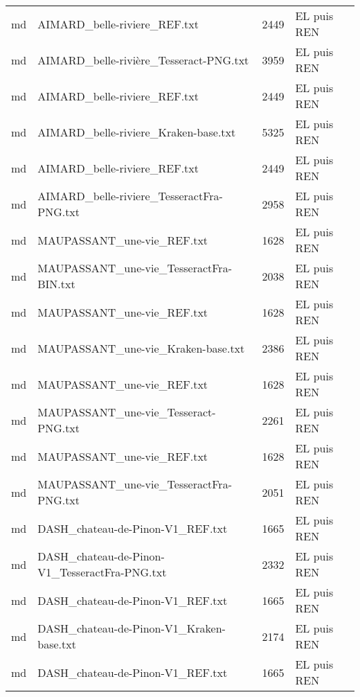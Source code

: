 \begin{tabular}{llrl}
    md &                       AIMARD\_belle-riviere\_REF.txt &                  2449 & EL puis REN \\
    md &             AIMARD\_belle-rivière\_Tesseract-PNG.txt &                  3959 & EL puis REN \\
    md &                       AIMARD\_belle-riviere\_REF.txt &                  2449 & EL puis REN \\
    md &               AIMARD\_belle-riviere\_Kraken-base.txt &                  5325 & EL puis REN \\
    md &                       AIMARD\_belle-riviere\_REF.txt &                  2449 & EL puis REN \\
    md &          AIMARD\_belle-riviere\_TesseractFra-PNG.txt &                  2958 & EL puis REN \\
    md &                         MAUPASSANT\_une-vie\_REF.txt &                  1628 & EL puis REN \\
    md &            MAUPASSANT\_une-vie\_TesseractFra-BIN.txt &                  2038 & EL puis REN \\
    md &                         MAUPASSANT\_une-vie\_REF.txt &                  1628 & EL puis REN \\
    md &                 MAUPASSANT\_une-vie\_Kraken-base.txt &                  2386 & EL puis REN \\
    md &                         MAUPASSANT\_une-vie\_REF.txt &                  1628 & EL puis REN \\
    md &               MAUPASSANT\_une-vie\_Tesseract-PNG.txt &                  2261 & EL puis REN \\
    md &                         MAUPASSANT\_une-vie\_REF.txt &                  1628 & EL puis REN \\
    md &            MAUPASSANT\_une-vie\_TesseractFra-PNG.txt &                  2051 & EL puis REN \\
    md &                   DASH\_chateau-de-Pinon-V1\_REF.txt &                  1665 & EL puis REN \\
    md &      DASH\_chateau-de-Pinon-V1\_TesseractFra-PNG.txt &                  2332 & EL puis REN \\
    md &                   DASH\_chateau-de-Pinon-V1\_REF.txt &                  1665 & EL puis REN \\
    md &           DASH\_chateau-de-Pinon-V1\_Kraken-base.txt &                  2174 & EL puis REN \\
    md &                   DASH\_chateau-de-Pinon-V1\_REF.txt &                  1665 & EL puis REN \\

\end{tabular}
